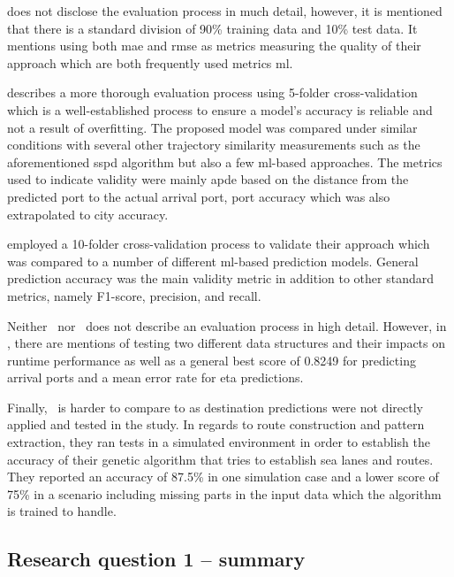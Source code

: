\cite{lechtenberg2019} does not disclose the evaluation process in much detail, however, it is mentioned that there is a standard division of 90\% training data and 10\% test data. It mentions using both \acrshort{mae} and \acrshort{rmse} as metrics measuring the quality of their approach which are both frequently used metrics \acrshort{ml}.

\cite{Zhang2020AISApproach} describes a more thorough evaluation process using 5-folder cross-validation which is a well-established process to ensure a model's accuracy is reliable and not a result of overfitting. The proposed model was compared under similar conditions with several other trajectory similarity measurements such as the aforementioned \acrshort{sspd} algorithm but also a few \acrshort{ml}-based approaches. The metrics used to indicate validity were mainly \acrfull{apde} based on the distance from the predicted port to the actual arrival port, port accuracy which was also extrapolated to city accuracy.

\cite{Karatas2020TrajectoryData} employed a 10-folder cross-validation process to validate their approach which was compared to a number of different \acrshort{ml}-based prediction models. General prediction accuracy was the main validity metric in addition to other standard metrics, namely F1-score, precision, and recall.

Neither~\cite{Bachar2018GrandDestination} nor~\cite{Rosca2018GrandRoutes} does not describe an evaluation process in high detail. However, in \cite{Rosca2018GrandRoutes}, there are mentions of testing two different data structures and their impacts on runtime performance as well as a general best score of 0.8249 for predicting arrival ports and a mean error rate for \acrshort{eta} predictions.

Finally,~\cite{Dobrkovic2018MaritimeData} is harder to compare to as destination predictions were not directly applied and tested in the study. In regards to route construction and pattern extraction, they ran tests in a simulated environment in order to establish the accuracy of their genetic algorithm that tries to establish sea lanes and routes. They reported an accuracy of 87.5\% in one simulation case and a lower score of 75\% in a scenario including missing parts in the input data which the algorithm is trained to handle.

\subsection{Research question 1 -- summary}
